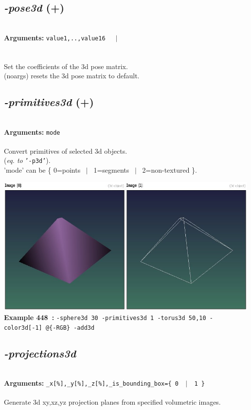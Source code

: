 \documentclass[a4paper,11pt,twoside]{book}
\begin{document}
\subsection{\emph{-pose3d} (+)}\vspace*{-0.5em}
~\\\textbf{Arguments: } 
{\small \texttt{value1,..,value16}}~~~$|$\\
\\~\\
Set the coefficients of the 3d pose matrix.
~\\(noargs) resets the 3d pose matrix to default.


\subsection{\emph{-primitives3d} (+)}\vspace*{-0.5em}
~\\\textbf{Arguments: } 
{\small \texttt{mode}}\\~\\
Convert primitives of selected 3d objects.
~\\(\emph{eq. to} {\small \texttt{'-p3d'}}).
~\\'mode' can be \{ 0=points ~$|$~ 1=segments ~$|$~ 2=non-textured \}.
\begin{center}\includegraphics[keepaspectratio=true,height=7cm,width=\textwidth]{img/gmic_def448.jpg}\\
{\footnotesize \textbf{Example 448~:} \texttt{-sphere3d 30 -primitives3d 1 -torus3d 50,10 -color3d[-1] @\{-RGB\} -add3d}}
\end{center}

\subsection{\emph{-projections3d} }\vspace*{-0.5em}
~\\\textbf{Arguments: } 
{\small \texttt{\_x[\%],\_y[\%],\_z[\%],\_is\_bounding\_box=\{ 0 ~$|$~ 1 \}}}\\~\\
Generate 3d xy,xz,yz projection planes from specified volumetric images.
\end{document}
